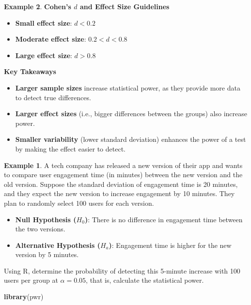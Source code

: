 \documentclass[
  11pt,
  oneside]{book}
\newenvironment{Shaded}{\begin{snugshade}}{\end{snugshade}}
\newcommand{\FunctionTok}[1]{\textcolor[rgb]{0.13,0.29,0.53}{\textbf{#1}}}
\newcommand{\NormalTok}[1]{#1}
\providecommand{\tightlist}{%
  \setlength{\itemsep}{0pt}\setlength{\parskip}{0pt}}
\theoremstyle{definition}
\theoremstyle{definition}
\newtheorem{example}{Example}[chapter]
\theoremstyle{definition}
\theoremstyle{definition}
\theoremstyle{remark}
\begin{document}
\begin{example}
\vfill

\textbf{Cohen's \(d\) and Effect Size Guidelines}

\begin{itemize}
\item
  \textbf{Small effect size}: \(d < 0.2\)
\item
  \textbf{Moderate effect size}: \(0.2 < d < 0.8\)
\item
  \textbf{Large effect size}: \(d > 0.8\)
\end{itemize}

\vfill

\textbf{Key Takeaways}

\begin{itemize}
\item
  \textbf{Larger sample sizes} increase statistical power, as they provide more data to detect true differences.
\item
  \textbf{Larger effect sizes} (i.e., bigger differences between the groups) also increase power.
\item
  \textbf{Smaller variability} (lower standard deviation) enhances the power of a test by making the effect easier to detect.
\end{itemize}

\vfill \vfill \vfill \vfill \vfill

\newpage

\begin{example}
A tech company has released a new version of their app and wants to compare user engagement time (in minutes) between the new version and the old version. Suppose the standard deviation of engagement time is 20 minutes, and they expect the new version to increase engagement by 10 minutes. They plan to randomly select 100 users for each version.

\begin{itemize}
\tightlist
\item
  \textbf{Null Hypothesis (\(H_0\))}: There is no difference in engagement time between the two versions.
\item
  \textbf{Alternative Hypothesis (\(H_a\))}: Engagement time is higher for the new version by 5 minutes.
\end{itemize}

Using R, determine the probability of detecting this 5-minute increase with 100 users per group at \(\alpha = 0.05\), that is, calculate the statistical power.
\end{example}

\begin{Shaded}
\begin{Highlighting}[]
\FunctionTok{library}\NormalTok{(pwr)}


\end{Highlighting}
\end{Shaded}
\end{example}
\end{document}
